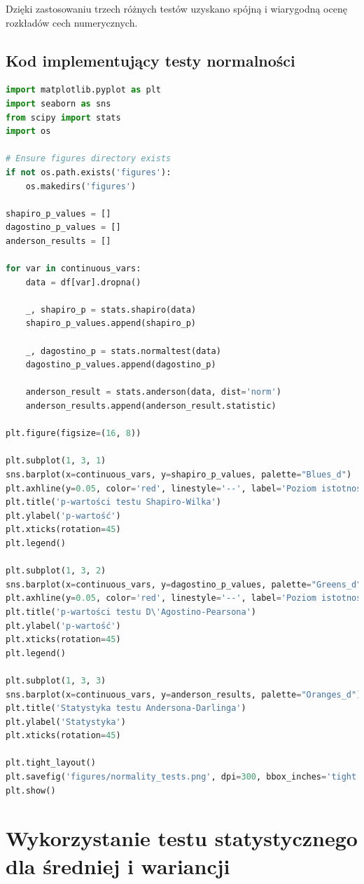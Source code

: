 \documentclass[12pt,a4paper]{article}
\begin{document}
Dzięki zastosowaniu trzech różnych testów uzyskano spójną i wiarygodną ocenę rozkładów cech numerycznych.

\subsection{Kod implementujący testy normalności}
\begin{lstlisting}[language=Python, caption=Kod testów normalności]
import matplotlib.pyplot as plt
import seaborn as sns
from scipy import stats
import os

# Ensure figures directory exists
if not os.path.exists('figures'):
    os.makedirs('figures')

shapiro_p_values = []
dagostino_p_values = []
anderson_results = []

for var in continuous_vars:
    data = df[var].dropna()
    
    _, shapiro_p = stats.shapiro(data)
    shapiro_p_values.append(shapiro_p)
    
    _, dagostino_p = stats.normaltest(data)
    dagostino_p_values.append(dagostino_p)
    
    anderson_result = stats.anderson(data, dist='norm')
    anderson_results.append(anderson_result.statistic)

plt.figure(figsize=(16, 8))

plt.subplot(1, 3, 1)
sns.barplot(x=continuous_vars, y=shapiro_p_values, palette="Blues_d")
plt.axhline(y=0.05, color='red', linestyle='--', label='Poziom istotności (0.05)')
plt.title('p-wartości testu Shapiro-Wilka')
plt.ylabel('p-wartość')
plt.xticks(rotation=45)
plt.legend()

plt.subplot(1, 3, 2)
sns.barplot(x=continuous_vars, y=dagostino_p_values, palette="Greens_d")
plt.axhline(y=0.05, color='red', linestyle='--', label='Poziom istotności (0.05)')
plt.title('p-wartości testu D\'Agostino-Pearsona')
plt.ylabel('p-wartość')
plt.xticks(rotation=45)
plt.legend()

plt.subplot(1, 3, 3)
sns.barplot(x=continuous_vars, y=anderson_results, palette="Oranges_d")
plt.title('Statystyka testu Andersona-Darlinga')
plt.ylabel('Statystyka')
plt.xticks(rotation=45)

plt.tight_layout()
plt.savefig('figures/normality_tests.png', dpi=300, bbox_inches='tight')
plt.show()
\end{lstlisting}

\section{Wykorzystanie testu statystycznego dla średniej i wariancji}
\end{document}
